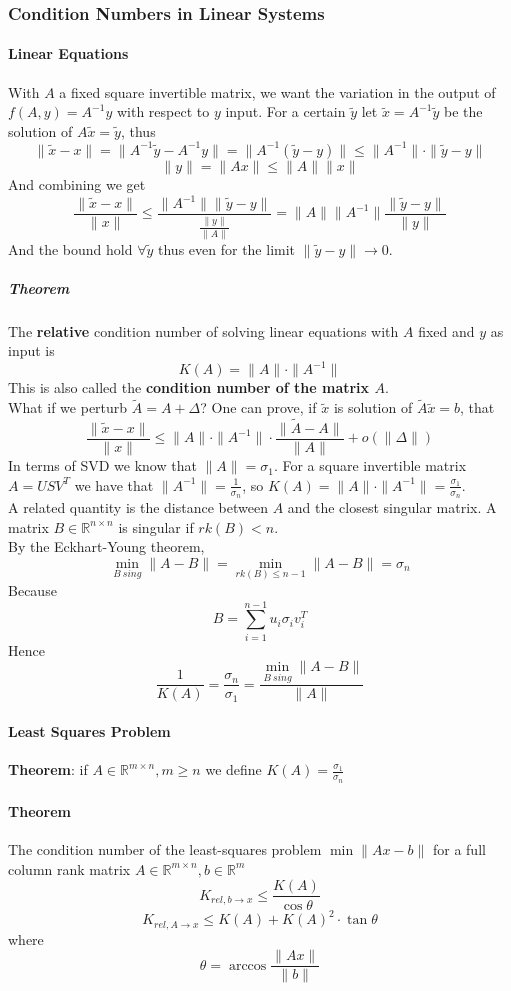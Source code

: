 \documentclass[10pt]{report}
\begin{document}
\subsubsection{Condition Numbers in Linear Systems}
\paragraph{Linear Equations} With $A$ a fixed square invertible matrix, we want the variation in the output of $f(A,y) = A^{-1}y$ with respect to $y$ input. For a certain $\tilde{y}$ let $\tilde{x}=A^{-1}\tilde{y}$ be the solution of $A\tilde{x}=\tilde{y}$, thus
$$\|\tilde{x}-x\|=\|A^{-1}\tilde{y}-A^{-1}y\| = \|A^{-1}(\tilde{y}-y)\|\leq\|A^{-1}\|\cdot\|\tilde{y}-y\|$$
$$\|y\|=\|Ax\|\leq\|A\|\|x\|$$
And combining we get $$\frac{\|\tilde{x} - x\|}{\|x\|}\leq \frac{\|A^{-1}\|\|\tilde{y}-y\|}{\frac{\|y\|}{\|A\|}} = \|A\|\|A^{-1}\|\frac{\|\tilde{y}-y\|}{\|y\|}$$
And the bound hold $\forall\tilde{y}$ thus even for the limit $\|\tilde{y}-y\|\rightarrow 0$.
\subparagraph{Theorem} The \textbf{relative} condition number of solving linear equations with $A$ fixed and $y$ as input is $$K(A)=\|A\|\cdot\|A^{-1}\|$$ This is also called the \textbf{condition number of the matrix $A$}.\\
What if we perturb $\tilde{A} = A + \Delta$? One can prove, if $\tilde{x}$ is solution of $\tilde{A}\tilde{x} = b$, that $$\frac{\|\tilde{x} - x\|}{\|x\|} \leq \|A\|\cdot\|A^{-1}\|\cdot\frac{\|\tilde{A}-A\|}{\|A\|}+o(\|\Delta\|)$$
In terms of SVD we know that $\|A\| = \sigma_1$. For a square invertible matrix $A=USV^T$ we have that $\|A^{-1}\| = \frac{1}{\sigma_n}$, so $K(A) = \|A\|\cdot\|A^{-1}\| = \frac{\sigma_1}{\sigma_n}$.\\
A related quantity is the distance between $A$ and the closest singular matrix. A matrix $B\in \mathbb{R}^{n\times n}$ is singular if $rk(B)<n$.\\
By the Eckhart-Young theorem, $$\min_{B\:sing}\|A-B\| = \min_{rk(B)\leq n-1}\|A-B\| = \sigma_n$$ Because $$B=\sum_{i=1}^{n-1} u_i\sigma_iv_i^T$$ Hence $$\frac{1}{K(A)} = \frac{\sigma_n}{\sigma_1} = \frac{\min\limits_{B\:sing}\|A-B\|}{\|A\|}$$
\paragraph{Least Squares Problem} \textbf{Theorem}: if $A\in \mathbb{R}^{m\times n}, m\geq n$ we define $K(A)=\frac{\sigma_1}{\sigma_n}$
\paragraph{Theorem} The condition number of the least-squares problem $\min\|Ax-b\|$ for a full column rank matrix $A\in \mathbb{R}^{m\times n},b\in \mathbb{R}^m$ $$K_{rel,b\rightarrow x }\leq \frac{K(A)}{\cos\theta}$$ $$K_{rel,A\rightarrow x} \leq K(A) + K(A)^2\cdot\tan\theta$$ where $$\theta=\arccos\frac{\|Ax\|}{\|b\|}$$
\end{document}
